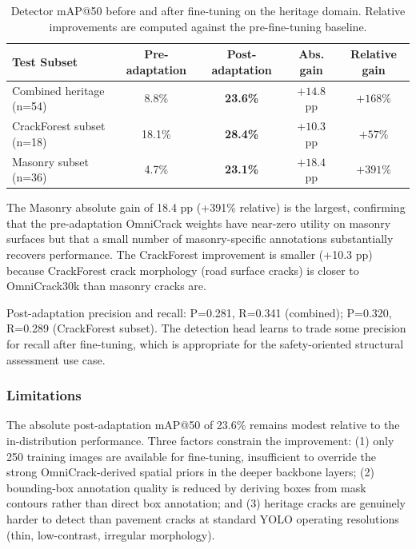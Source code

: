 \documentclass[12pt,a4paper]{article}
\begin{document}
\begin{table}[H]
\centering
\caption{Detector mAP@50 before and after fine-tuning on the heritage domain. Relative improvements are computed against the pre-fine-tuning baseline.}
\label{tab:det_ft}
\begin{tabular}{lcccc}
\toprule
\rowcolor{white}
\textbf{Test Subset} & \textbf{Pre-adaptation} & \textbf{Post-adaptation} & \textbf{Abs. gain} & \textbf{Relative gain} \\
\midrule
Combined heritage (n=54) & 8.8\% & \textbf{23.6\%} & $+14.8$ pp & $+168\%$ \\
CrackForest subset (n=18) & 18.1\% & \textbf{28.4\%} & $+10.3$ pp & $+57\%$ \\
Masonry subset (n=36) & 4.7\% & \textbf{23.1\%} & $+18.4$ pp & $+391\%$ \\
\bottomrule
\end{tabular}
\end{table}

The Masonry absolute gain of 18.4 pp (+391\% relative) is the largest, confirming that the pre-adaptation OmniCrack weights have near-zero utility on masonry surfaces but that a small number of masonry-specific annotations substantially recovers performance. The CrackForest improvement is smaller (+10.3 pp) because CrackForest crack morphology (road surface cracks) is closer to OmniCrack30k than masonry cracks are.

Post-adaptation precision and recall: P=0.281, R=0.341 (combined); P=0.320, R=0.289 (CrackForest subset). The detection head learns to trade some precision for recall after fine-tuning, which is appropriate for the safety-oriented structural assessment use case.

\subsubsection{Limitations}

The absolute post-adaptation mAP@50 of 23.6\% remains modest relative to the in-distribution performance. Three factors constrain the improvement: (1) only 250 training images are available for fine-tuning, insufficient to override the strong OmniCrack-derived spatial priors in the deeper backbone layers; (2) bounding-box annotation quality is reduced by deriving boxes from mask contours rather than direct box annotation; and (3) heritage cracks are genuinely harder to detect than pavement cracks at standard YOLO operating resolutions (thin, low-contrast, irregular morphology).
\end{document}
